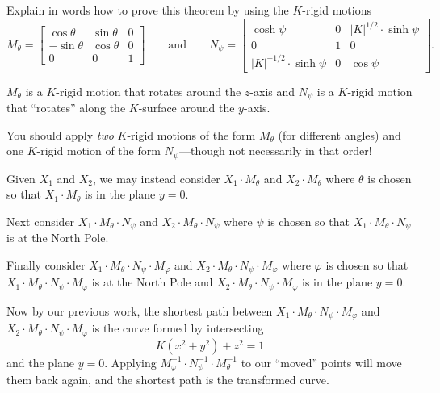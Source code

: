 \documentclass{ximera}
\begin{document}
\begin{problem}
  Explain in words how to prove this theorem by using the $K$-rigid
  motions
  \[
  M_\theta=
  \begin{bmatrix}
    \cos\theta & \sin\theta & 0\\
    -\sin\theta & \cos\theta & 0\\
    0 & 0 & 1
  \end{bmatrix}
  \qquad\text{and}\qquad
  N_\psi=
  \begin{bmatrix}
    \cosh\psi & 0 & |K|^{1/2}\cdot\sinh\psi\\
    0 & 1 & 0\\
    |K|^{-1/2}\cdot\sinh\psi & 0 & \cos\psi
  \end{bmatrix}.
  \]
  \begin{hint}
    $M_\theta$ is a $K$-rigid motion that rotates around the $z$-axis
    and $N_\psi$ is a $K$-rigid motion that ``rotates'' along the
    $K$-surface around the $y$-axis.
  \end{hint}
  \begin{hint}
    You should apply \textit{two} $K$-rigid motions of the form
    $M_\theta$ (for different angles) and one $K$-rigid motion of the
    form $N_\psi$---though not necessarily in that order!
  \end{hint}
  \begin{freeResponse}
    Given $X_1$ and $X_2$, we may instead consider $X_1\cdot M_\theta$
    and $X_2\cdot M_\theta$ where $\theta$ is chosen so that $X_1\cdot
    M_\theta$ is in the plane $y=0$.

    Next consider $X_1\cdot M_\theta\cdot N_\psi$ and $X_2\cdot
    M_\theta\cdot N_\psi$ where $\psi$ is chosen so that $X_1\cdot
    M_\theta\cdot N_\psi$ is at the North Pole.

    Finally consider $X_1\cdot M_\theta\cdot N_\psi\cdot M_\varphi$
    and $X_2\cdot M_\theta\cdot N_\psi\cdot M_\varphi$ where $\varphi$
    is chosen so that $X_1\cdot M_\theta\cdot N_\psi\cdot M_\varphi$
    is at the North Pole and $X_2\cdot M_\theta\cdot N_\psi\cdot
    M_\varphi$ is in the plane $y=0$.

    Now by our previous work, the shortest path between $X_1\cdot
    M_\theta\cdot N_\psi\cdot M_\varphi$ and $X_2\cdot M_\theta\cdot
    N_\psi\cdot M_\varphi$ is the curve formed by intersecting
    \[
    K(x^2+y^2)+z^2=1
    \]
    and the plane $y=0$. Applying $M_\varphi^{-1}\cdot
    N_\psi^{-1}\cdot M_\theta^{-1}$ to our ``moved'' points will move
    them back again, and the shortest path is the transformed curve.
  \end{freeResponse}
\end{problem}
\end{document}
